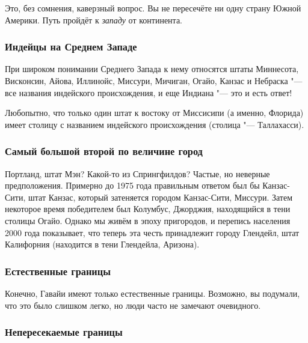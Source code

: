 \documentclass[twoside]{book}
\begin{document}
Это, без сомнения, каверзный вопрос. %
Вы не пересечёте ни одну страну Южной Америки.
Путь пройдёт к \emph{западу} от континента.
\heart

\subsubsection*{Индейцы на Среднем Западе}%

При широком понимании Среднего Запада к нему относятся штаты Миннесота, Висконсин, Айова,
Иллинойс, Миссури, Мичиган, Огайо, Канзас и Небраска "--- все названия индейского
происхождения, и еще Индиана "--- это и есть ответ!\heart

\medskip
Любопытно, что только один штат к востоку от Миссисипи (а именно,
Флорида) имеет столицу
с названием индейского происхождения (столица "--- Таллахасси).

\subsubsection*{Самый большой второй по величине город}%

Портланд, штат Мэн? Какой-то из Спрингфилдов? 
Частые, но неверные предположения.
Примерно до 1975 года правильным ответом был бы Канзас-Сити, штат Канзас, который затеняется городом Канзас-Сити, Миссури.
Затем некоторое время победителем был Колумбус, Джорджия, находящийся в тени столицы Огайо.
Однако мы живём в эпоху пригородов, и %
перепись населения 2000 года показывает, что теперь эта честь принадлежит городу Глендейл, штат Калифорния (находится в тени Глендейла, Аризона).\heart

\subsubsection*{Естественные границы}%

Конечно, Гавайи имеют только естественные границы.
Возможно, вы
подумали, что это было слишком легко, но люди часто не замечают
очевидного. \heart

\subsubsection*{Непересекаемые границы}%
\end{document}
